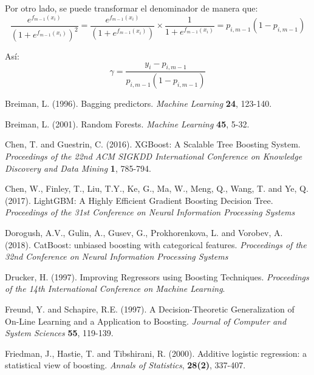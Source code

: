\documentclass[12pt,twoside]{article}
\begin{document}
Por otro lado, se puede transformar el denominador de manera que:
\begin{equation*}
\frac{e^{f_{m-1}(x_i)}}{(1 + e^{f_{m-1}(x_i)})^2} = \frac{e^{f_{m-1}(x_i)}}{(1 + e^{f_{m-1}(x_i)})} \times \frac{1}{1 + e^{f_{m-1}(x_i)}} = p_{i, m-1}(1 - p_{i, m-1})
\end{equation*}

Así:
\begin{equation*}
\gamma = \frac{y_i - p_{i, m-1}}{p_{i, m-1}(1 - p_{i, m-1})}
\end{equation*}





\newpage
{}
\begin{thebibliography}{100}
 Breiman, L. (1996). Bagging predictors. \textit{Machine Learning} \textbf{24}, 123-140.

 Breiman, L. (2001). Random Forests. \textit{Machine Learning} \textbf{45}, 5-32.

 Chen, T. and Guestrin, C. (2016). XGBoost: A Scalable Tree Boosting System. \textit{Proceedings of the 22nd ACM SIGKDD International Conference on Knowledge Discovery and Data Mining} \textbf{1}, 785-794.

 Chen, W., Finley, T., Liu, T.Y., Ke, G., Ma, W., Meng, Q., Wang, T. and Ye, Q. (2017). LightGBM: A Highly Efficient Gradient Boosting Decision Tree. \textit{Proceedings of the 31st Conference on Neural Information Processing Systems}

 Dorogush, A.V., Gulin, A., Gusev, G., Prokhorenkova, L. and Vorobev, A. (2018). CatBoost: unbiased boosting with categorical features. \textit{Proceedings of the 32nd Conference on Neural Information Processing Systems}

 Drucker, H. (1997). Improving Regressors using Boosting Techniques. \textit{Proceedings of the 14th International Conference on Machine Learning}.

 Freund, Y. and Schapire, R.E. (1997). A Decision-Theoretic Generalization of On-Line Learning and a Application to Boosting. \textit{Journal of Computer and System Sciences} \textbf{55}, 119-139.

 Friedman, J., Hastie, T. and Tibshirani, R. (2000). Additive logistic regression: a statistical view of boosting. \textit{Annals of Statistics}, \textbf{28(2)}, 337-407.


\end{thebibliography}
\end{document}
